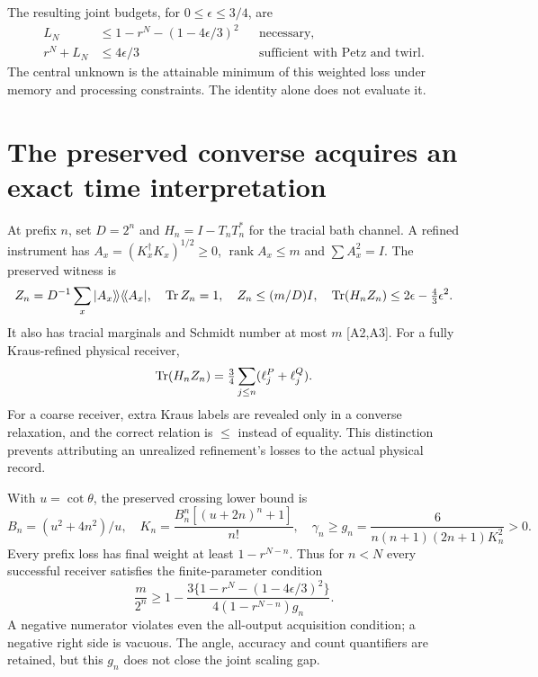 The resulting joint budgets, for $0\le\epsilon\le3/4$, are
\begin{align}
 L_N&\le1-r^N-(1-4\epsilon/3)^2&&\text{necessary},\label{eq:necessary}\\
 r^N+L_N&\le4\epsilon/3&&\text{sufficient with Petz and twirl}.
\end{align}
The central unknown is the attainable minimum of this weighted loss under
memory and processing constraints. The identity alone does not evaluate it.

\section{The preserved converse acquires an exact time interpretation}
At prefix $n$, set $D=2^n$ and $H_n=I-T_nT_n^*$ for the tracial bath channel.
A refined instrument has $A_x=(K_x^\dagger K_x)^{1/2}\ge0$,
$\operatorname{rank}A_x\le m$ and $\sum A_x^2=I$. The preserved witness is
\[
 Z_n=D^{-1}\sum_x|A_x\rangle\!\rangle\langle\!\langle A_x|,
 \quad\operatorname{Tr} Z_n=1,\quad Z_n\le(m/D)I,
 \quad\operatorname{Tr}(H_nZ_n)\le2\epsilon-\tfrac43\epsilon^2.
\]
It also has tracial marginals and Schmidt number at most $m$ [A2,A3]. For a
fully Kraus-refined physical receiver,
\[
 \operatorname{Tr}(H_nZ_n)=\tfrac34\sum_{j\le n}(\ell_j^P+\ell_j^Q).
\]
For a coarse receiver, extra Kraus labels are revealed only in a converse
relaxation, and the correct relation is $\le$ instead of equality. This
distinction prevents attributing an unrealized refinement's losses to the
actual physical record.

With $u=\cot\theta$, the preserved crossing lower bound is
\[
 B_n=(u^2+4n^2)/u,\quad K_n=\frac{B_n^n[(u+2n)^n+1]}{n!},\quad
 \gamma_n\ge g_n=\frac{6}{n(n+1)(2n+1)K_n^2}>0.
\]
Every prefix loss has final weight at least $1-r^{N-n}$. Thus for $n<N$
every successful receiver satisfies the finite-parameter condition
\begin{equation}
 \frac m{2^n}\ge1-
 \frac{3\{1-r^N-(1-4\epsilon/3)^2\}}
 {4(1-r^{N-n})g_n}.\label{eq:jointprefix}
\end{equation}
A negative numerator violates even the all-output acquisition condition; a
negative right side is vacuous. The angle, accuracy and count quantifiers
are retained, but this $g_n$ does not close the joint scaling gap.

